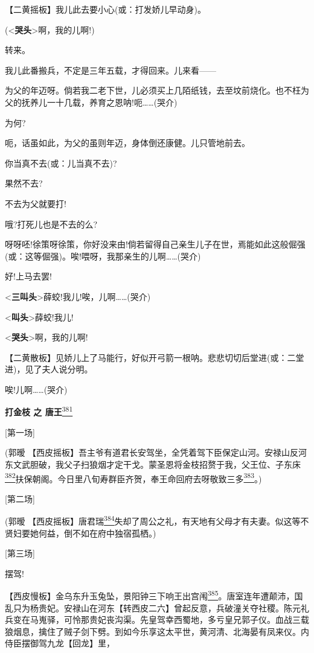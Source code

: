 【二黄摇板】我儿此去要小心(或：打发娇儿早动身)。

(\textless{}\textbf{哭头}\textgreater{}啊，我的儿啊!)

转来。

我儿此番搬兵，不定是三年五载，才得回来。儿来看------

为父的年迈呀。倘若我二老下世，儿必须买上几陌纸钱，去至坟前烧化。也不枉为父的抚养儿一十几载，养育之恩呐!呃\ldots{}\ldots{}(哭介)

为何?

呃，话虽如此，为父的虽则年迈，身体倒还康健。儿只管地前去。

你当真不去(或：儿当真不去)?

果然不去?

不去为父就要打!

哦?打死儿也是不去的么?

呀呀呸!徐策呀徐策，你好没来由!倘若留得自己亲生儿子在世，焉能如此这般倔强(或：这等倔强)。唉!喂呀，我那亲生的儿啊\ldots{}\ldots{}(哭介)

好!上马去罢!

\textless{}\textbf{三叫头}\textgreater{}薛蛟!我儿!唉，儿啊\ldots{}\ldots{}(哭介)

\textless{}\textbf{叫头}\textgreater{}薛蛟!我儿!

\textless{}\textbf{哭头}\textgreater{}啊，我的儿啊!

【二黄散板】见娇儿上了马能行，好似开弓箭一根呐。悲悲切切后堂进(或：二堂进)，见了夫人说分明。

唉!儿啊\ldots{}\ldots{}(哭介)

\textbf{打金枝 之 唐王}\protect\hyperlink{fn381}{\textsuperscript{381}}

{[}第一场{]}

(郭暧
【西皮摇板】吾主爷有道君长安驾坐，全凭着驾下臣保定山河。安禄山反河东文武胆破，我父子扫狼烟才定干戈。蒙圣恩将金枝招赘于我，父王位、子东床\protect\hyperlink{fn382}{\textsuperscript{382}}扶保朝阁。今日里八旬寿群臣齐贺，奉王命回府去呀敬致三多\protect\hyperlink{fn383}{\textsuperscript{383}}。)

{[}第二场{]}

(郭暧
【西皮摇板】唐君瑞\protect\hyperlink{fn384}{\textsuperscript{384}}失却了周公之礼，有天地有父母才有夫妻。似这等不贤妇要她何益，倒不如在府中独宿孤栖。)

{[}第三场{]}

摆驾!

【西皮慢板】金乌东升玉兔坠，景阳钟三下响王出宫闱\protect\hyperlink{fn385}{\textsuperscript{385}}。唐室连年遭颠沛，国乱只为杨贵妃。安禄山在河东【转西皮二六】曾起反意，兵破潼关夺社稷。陈元礼兵变在马嵬驿，可怜那贵妃丧沟渠。先皇驾幸西蜀地，多亏皇兄郭子仪。血战三载狼烟息，擒住了贼子剑下劈。到如今乐享这太平世，黄河清、北海晏有凤来仪。内侍臣摆御驾九龙【回龙】里，

